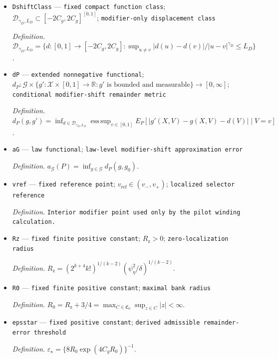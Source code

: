 \documentclass{article}
\begin{document}
\begin{itemize}
  \par\smallskip\noindent\emph{Definition.} \texttt{Hölder radius of the removable modifier-\allowbreak{}only code displacement.}
  \item \texttt{DshiftClass} --- \texttt{fixed compact function class}; \(\mathcal D_{\gamma_D,L_D}\subset[-2C_g,2C_g]^{[0,1]}\); \texttt{modifier-\allowbreak{}only displacement class}
  \par\smallskip\noindent\emph{Definition.} \(\mathcal D_{\gamma_D,L_D}=\{d:[0,1]\to[-2C_g,2C_g]:\sup_{u\ne v}|d(u)-d(v)|/|u-v|^{\gamma_D}\le L_D\}\).
  \item \texttt{dP} --- \texttt{extended nonnegative functional}; \(d_P:\mathcal G\times\{g':\mathcal X\times[0,1]\to\mathbb R:g'\text{ is bounded and measurable}\}\to[0,\infty]\); \texttt{conditional modifier-\allowbreak{}shift remainder metric}
  \par\smallskip\noindent\emph{Definition.} \(d_P(g,g')=\inf_{d\in\mathcal D_{\gamma_D,L_D}}\operatorname*{ess\,sup}_{v\in[0,1]}E_P[|g'(X,V)-g(X,V)-d(V)|\mid V=v]\).
  \item \texttt{aG} --- \texttt{law functional}; \texttt{law-\allowbreak{}level modifier-\allowbreak{}shift approximation error}
  \par\smallskip\noindent\emph{Definition.} \(a_{\mathcal G}(P)=\inf_{g\in\mathcal G}d_P(g,g_0)\).
  \item \texttt{vref} --- \texttt{fixed reference point}; \(v_{\mathrm{ref}}\in(v_-,v_+)\); \texttt{localized selector reference}
  \par\smallskip\noindent\emph{Definition.} \texttt{Interior modifier point used only by the pilot winding calculation.}
  \item \texttt{Rz} --- \texttt{fixed finite positive constant}; \(R_{\mathrm z}>0\); \texttt{zero-\allowbreak{}localization radius}
  \par\smallskip\noindent\emph{Definition.} \(R_{\mathrm z}=(2^{k+4}k!)^{1/(k-2)}(\psi_\eta^2/\delta)^{1/(k-2)}\).
  \item \texttt{R0} --- \texttt{fixed finite positive constant}; \texttt{maximal bank radius}
  \par\smallskip\noindent\emph{Definition.} \(R_0=R_{\mathrm z}+3/4=\max_{C\in\mathfrak C_0}\sup_{z\in C}|z|<\infty\).
  \item \texttt{epsstar} --- \texttt{fixed positive constant}; \texttt{derived admissible remainder-\allowbreak{}error threshold}
  \par\smallskip\noindent\emph{Definition.} \(\varepsilon_\star=\{8R_0\exp(4C_gR_0)\}^{-1}\).

\end{itemize}
\end{document}
